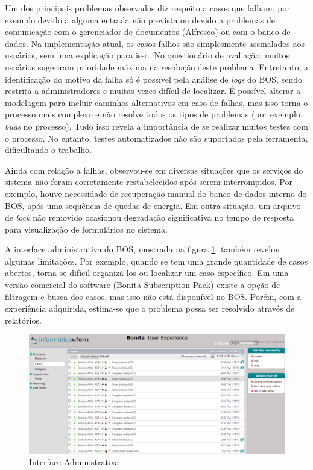 \documentclass[12pt]{article}
\begin{document}
Um dos principais problemas observados diz respeito a casos que falham, por exemplo devido a alguma entrada não prevista ou devido a problemas de comunicação com o gerenciador de documentos (Alfresco) ou com o banco de dados. Na implementação atual, os casos falhos são simplesmente assinalados aos usuários, sem uma explicação para isso. No questionário de avaliação, muitos usuários sugeriram prioridade máxima na resolução deste problema. Entretanto, a identificação do motivo da falha só é possível pela análise de \emph{logs} do BOS, sendo restrita a administradores e muitas vezes difícil de localizar. É possível alterar a modelagem para incluir caminhos alternativos em caso de falhas, mas isso torna o processo mais complexo e não resolve todos os tipos de problemas (por exemplo, \emph{bugs} no processo). Tudo isso revela a importância de se realizar muitos testes com o processo. No entanto, testes automatizados não são suportados pela ferramenta, dificultando o trabalho.


Ainda com relação a falhas, observou-se em diversas situações que os serviços do sistema não foram corretamente restabelecidos após serem interrompidos. Por exemplo, houve necessidade de recuperação manual do banco de dados interno do BOS, após uma sequência de quedas de energia. Em outra situação, um arquivo de \emph{lock} não removido ocasionou degradação significativa no tempo de resposta para visualização de formulários no sistema.

A interface administrativa do BOS, mostrada na figura \ref{fig:interfaceadm}, também revelou algumas limitações. Por exemplo, quando se tem uma grande quantidade de casos abertos, torna-se difícil organizá-los ou localizar um caso específico. Em uma versão comercial do software (Bonita Subscription Pack) existe a opção de filtragem e busca dos casos, mas isso não está disponível no BOS. Porém, com a experiência adquirida, estima-se que o problema possa ser resolvido através de relatórios.

\begin{figure}[ht]
\centering
\includegraphics[width=.99\textwidth]{images/interfaceAdministrativa.png}
\caption{Interface Administrativa}
\label{fig:interfaceadm}
\end{figure}
\end{document}
